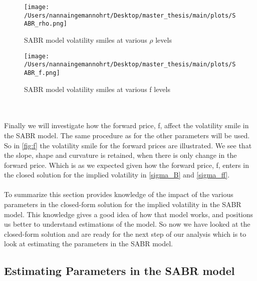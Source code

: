 \begin{figure}[H]
    \centering
    \texttt{[image: /Users/nannaingemannohrt/Desktop/master\_thesis/main/plots/SABR\_rho.png]}
    \caption{SABR model volatility smiles at various $\rho$ levels}
    \label{fig:rho}
\end{figure}

\begin{figure}[H]
    \centering
    \texttt{[image: /Users/nannaingemannohrt/Desktop/master\_thesis/main/plots/SABR\_f.png]}
    \caption{SABR model volatility smiles at various f levels}
    \label{fig:f}
\end{figure}
\noindent
\\\\
Finally we will investigate how the forward price, f, affect the volatility smile in the SABR model. 
The same procedure as for the other parameters will be used. So in \autoref{fig:f} the volatility smile
for the forward prices are illustrated. We see that the slope, shape and curvature is retained, when there
is only change in the forward price. Which is as we expected given how the forward price, f, enters in the closed
solution for the implied volatility in \autoref{sigma_B} and \autoref{sigma_ff}.
\\\\
To summarize this section provides knowledge of the impact of the various parameters in the closed-form solution
for the implied volatility in the SABR model. This knowledge gives a good idea of how that model works, and 
positions us better to understand estimations of the model. So now we have looked at the closed-form solution and 
are ready for the next step of our analysis which is to look at  estimating the parameters in the SABR model.
\newpage
\subsection{Estimating Parameters in the SABR model}

